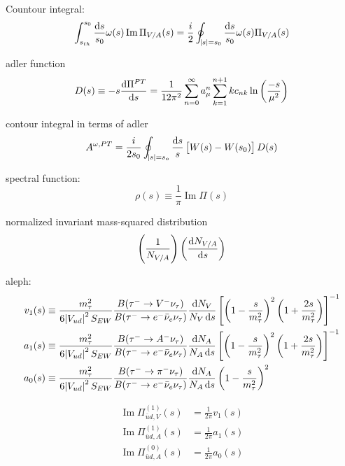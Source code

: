 \documentclass{article}
\begin{document}
  Countour integral:
  \begin{equation}
    \int_{s_{th}}^{s_0} \frac{\dif s}{s_0} \omega(s) \operatorname{Im} \Pi_{V/A}(s) = \frac{i}{2} \oint_{\envert{s}=s_0} \frac{\dif s}{s_0} \omega(s) \Pi_{V/A}(s)
  \end{equation}

  adler function
  \begin{equation}
    D(s) \equiv -s \frac{\dif \Pi^{PT}}{\dif s} = \frac{1}{12\pi^2}\sum_{n=0}^\infty a_\mu^n \sum_{k=1}^{n+1} k c_{nk} \ln\left( \frac{-s}{\mu^2} \right)
  \end{equation}

  contour integral in terms of adler
  \begin{equation}
    A^{\omega,PT} = \frac{i}{2 s_0} \oint_{\envert{s}=s_o} \frac{\dif s}{s} \left[ W(s) - W(s_0) \right] D(s)
  \end{equation}

  spectral function:
  \begin{equation}
    \rho(s) \equiv \frac{1}{\pi} \operatorname{Im}\Pi(s)
  \end{equation}

  normalized invariant mass-squared distribution
  \begin{equation}
    \left( \frac{1}{N_{V/A}} \right)\left( \frac{\dif N_{V/A}}{\dif s} \right)
  \end{equation}
  
  aleph:
  \begin{equation}
    \begin{split}
      v_1(s) &\equiv \frac{m_\tau^2}{6 \envert{V_{ud}}^2S_{EW}} \frac{B(\tau^- \to V^- \nu_\tau)}{B(\tau^- \to e^- \bar \nu_e \nu_\tau)} \frac{\dif N_V}{N_V \dif s} \left[ \left( 1 - \frac{s}{m_\tau^2} \right)^2 \left( 1 + \frac{2 s}{m_\tau^2}\right) \right]^{-1} \\
      a_1(s) &\equiv \frac{m_\tau^2}{6 \envert{V_{ud}}^2S_{EW}} \frac{B(\tau^- \to A^- \nu_\tau)}{B(\tau^- \to e^- \bar \nu_e \nu_\tau)} \frac{\dif N_A}{N_A \dif s} \left[ \left( 1 - \frac{s}{m_\tau^2} \right)^2 \left( 1 + \frac{2 s}{m_\tau^2}\right) \right]^{-1} \\
      a_0(s) &\equiv \frac{m_\tau^2}{6 \envert{V_{ud}}^2S_{EW}} \frac{B(\tau^- \to \pi^- \nu_\tau)}{B(\tau^- \to e^- \bar \nu_e \nu_\tau)} \frac{\dif N_A}{N_A \dif s} \left( 1 - \frac{s}{m_\tau^2} \right)^2
    \end{split}
  \end{equation} 

  \begin{equation}
    \begin{split}
      \operatorname{Im} \Pi_{\bar u d,V}^{(1)}(s) &= \frac{1}{2\pi} v_1(s) \\
      \operatorname{Im} \Pi_{\bar u d,A}^{(1)}(s) &= \frac{1}{2\pi} a_1(s) \\
      \operatorname{Im} \Pi_{\bar u d,A}^{(0)}(s) &= \frac{1}{2\pi} a_0(s)
    \end{split}
  \end{equation}
\end{document}
